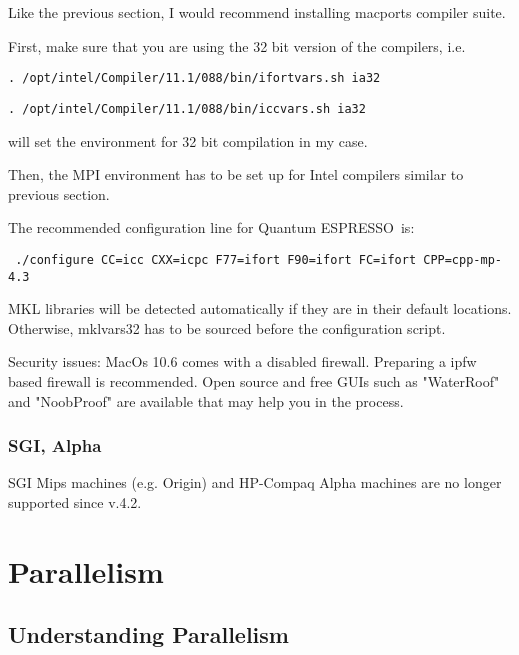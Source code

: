 \documentclass[12pt,a4paper]{article}
\def\qe{{\sc Quantum ESPRESSO}}
\begin{document}
Like the previous section, I would recommend installing macports compiler suite. 

First, make sure that you are using the 32 bit version of the compilers,
i.e.  
\begin{verbatim}
. /opt/intel/Compiler/11.1/088/bin/ifortvars.sh ia32
\end{verbatim}
\begin{verbatim}
. /opt/intel/Compiler/11.1/088/bin/iccvars.sh ia32
\end{verbatim}
will set the environment for 32 bit compilation in my case. 

Then, the MPI environment has to be set up for Intel compilers similar to previous 
section. 

The recommended configuration line for \qe\ is: 
\begin{verbatim}
 ./configure CC=icc CXX=icpc F77=ifort F90=ifort FC=ifort CPP=cpp-mp-4.3
\end{verbatim}
MKL libraries will be detected automatically if they are in their default locations. 
Otherwise, mklvars32 has to be sourced before the configuration script. 

Security issues: 
MacOs 10.6 comes with a disabled firewall. Preparing a ipfw based firewall is recommended. 
Open source and free GUIs such as "WaterRoof" and "NoobProof" are available that may help 
you in the process.

\subsubsection{SGI, Alpha}

SGI Mips machines (e.g. Origin) and HP-Compaq Alpha machines are
no longer supported since v.4.2.

\newpage

\section{Parallelism}
\label{Sec:para}

\subsection{Understanding Parallelism}
\end{document}
